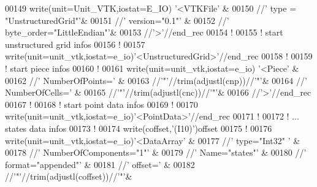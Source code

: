 \begin{DoxyCode}
00149 \textcolor{keyword}{write}(unit=Unit\_VTK,iostat=E\_IO)  \textcolor{stringliteral}{'<VTKFile'}                  &
00150                                 //\textcolor{stringliteral}{' type = "UnstructuredGrid"'}&
00151                                 //\textcolor{stringliteral}{' version="0.1"'}            &
00152                                 //\textcolor{stringliteral}{' byte\_order="LittleEndian"'}&
00153                                 //\textcolor{stringliteral}{'>'}//end\_rec
00154 \textcolor{comment}{!}
00155 \textcolor{comment}{! start unstructured grid infos}
00156 \textcolor{comment}{!}
00157 \textcolor{keyword}{write}(unit=unit\_vtk,iostat=e\_io)\textcolor{stringliteral}{'<UnstructuredGrid>'}//end\_rec
00158 \textcolor{comment}{!}
00159 \textcolor{comment}{! start piece infos}
00160 \textcolor{comment}{!}
00161 \textcolor{keyword}{write}(unit=unit\_vtk,iostat=e\_io)  \textcolor{stringliteral}{'<Piece'}                    &
00162                                 //\textcolor{stringliteral}{' NumberOfPoints='}          &
00163                                 //\textcolor{stringliteral}{'"'}//trim(adjustl(cnp))//\textcolor{stringliteral}{'"'}&
00164                                 //\textcolor{stringliteral}{' NumberOfCells='}           &
00165                                 //\textcolor{stringliteral}{'"'}//trim(adjustl(cnc))//\textcolor{stringliteral}{'"'}&
00166                                 //\textcolor{stringliteral}{'>'}//end\_rec
00167 \textcolor{comment}{!}
00168 \textcolor{comment}{! start point data infos }
00169 \textcolor{comment}{!}
00170 \textcolor{keyword}{write}(unit=unit\_vtk,iostat=e\_io)\textcolor{stringliteral}{'<PointData>'}//end\_rec
00171 \textcolor{comment}{!}
00172 \textcolor{comment}{! ... states data infos}
00173 \textcolor{comment}{!}
00174 \textcolor{keyword}{write}(coffset,\textcolor{stringliteral}{'(I10)'})offset
00175 \textcolor{comment}{!}
00176 \textcolor{keyword}{write}(unit=unit\_vtk,iostat=e\_io)\textcolor{stringliteral}{'<DataArray'}                      &
00177                                 //\textcolor{stringliteral}{' type="Int32" '}                &
00178                                 //\textcolor{stringliteral}{' NumberOfComponents="1"'}       &
00179                                 //\textcolor{stringliteral}{' Name="states"'}                &
00180                                 //\textcolor{stringliteral}{' format="appended"'}            &
00181                                 //\textcolor{stringliteral}{' offset='}                      &
00182                                 //\textcolor{stringliteral}{'"'}//trim(adjustl(coffset))//\textcolor{stringliteral}{'"'}&

\end{DoxyCode}
